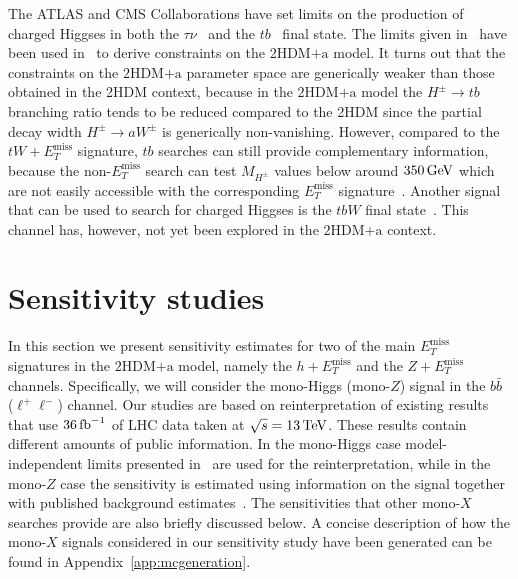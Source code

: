 \documentclass[a4paper, 11pt,notoc]{article}
\newcommand{\MET}{\ensuremath{E_T^\mathrm{miss}}\xspace}
\newcommand{\mHc}{\ensuremath{M_{H^{\pm}}}\xspace}
\newcommand{\hdma}{\ensuremath{\textrm{2HDM+a}}\xspace}
\begin{document}
The ATLAS and CMS Collaborations have set limits on the production of charged Higgses in both the $\tau \nu$~\cite{Aaboud:2016dig,CMS-PAS-HIG-16-031} and the $tb$~\cite{Aad:2015typ,Khachatryan:2015qxa,ATLAS:2016qiq} final state. The limits given in~\cite{ATLAS:2016qiq} have been used in~\cite{Pani:2017qyd} to derive constraints on the \hdma model. It turns out that  the constraints on the \hdma parameter space are generically weaker than those obtained in the 2HDM context, because in the \hdma model  the $H^\pm \to tb$ branching ratio tends to be reduced compared to the 2HDM since the partial decay width $H^\pm \to aW^\pm$ is generically non-vanishing.  However, compared to the $tW+\MET$ signature, $tb$ searches can still provide complementary information, because the non-$\MET$  search can test $\mHc$ values below around $350 \, {\rm GeV}$ which are not easily accessible with the corresponding $\MET$ signature~\cite{Pani:2017qyd}. Another signal that can be used to search for charged Higgses is the $tbW$ final state~\cite{Haisch:2018djm}. This channel has, however, not yet been explored in the \hdma context. 


\section{Sensitivity studies}
\label{sec:sensitivitystudies}

In this section we present sensitivity estimates for two of the main $\MET$ signatures in the \hdma model, namely the $h +\MET$  and the $Z+\MET$ channels. Specifically, we will consider the mono-Higgs (mono-$Z$) signal in the $b \bar b$ ($\ell^+ \ell^-$) channel.  Our studies are based on reinterpretation of existing results that use $36 \, {\rm fb}^{-1}$ of LHC data taken at $\sqrt{s} = 13 \, {\rm TeV}$. These results contain different amounts of public information. In the mono-Higgs case model-independent limits presented in~\cite{Aaboud:2017yqz} are used for the reinterpretation, while in the mono-$Z$ case  the sensitivity is estimated using information on the signal together with published background estimates~\cite{Aaboud:2017bja}.  The sensitivities that other mono-$X$ searches provide are also briefly discussed below.  A concise description of how the  mono-$X$ signals considered in our sensitivity study have been generated  can be found in Appendix~\ref{app:mcgeneration}.
\end{document}
